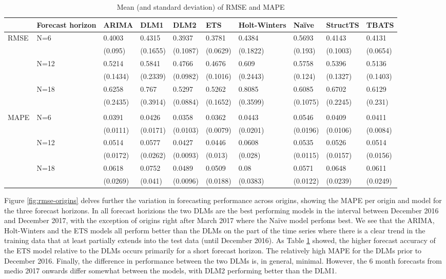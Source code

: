 \documentclass[]{article}
\begin{document}
\begin{table}[t]

\caption{\label{tab:error-comparison}Mean (and standard deviation) of RMSE and MAPE}
\centering
\begin{tabular}{llllllllll}
\toprule
 & Forecast horizon & ARIMA & DLM1 & DLM2 & ETS & Holt-Winters & Naïve & StructTS & TBATS\\
\midrule
RMSE & N=6 & 0.4003 & 0.4315 & 0.3937 & 0.3781 & 0.4384 & 0.5693 & 0.4143 & 0.4131\\
 &  & (0.095) & (0.1655) & (0.1087) & (0.0629) & (0.1822) & (0.193) & (0.1003) & (0.0654)\\
 & N=12 & 0.5214 & 0.5841 & 0.4766 & 0.4676 & 0.609 & 0.5758 & 0.5396 & 0.5136\\
 &  & (0.1434) & (0.2339) & (0.0982) & (0.1016) & (0.2443) & (0.124) & (0.1327) & (0.1403)\\
 & N=18 & 0.6258 & 0.767 & 0.5297 & 0.5262 & 0.8085 & 0.6085 & 0.6702 & 0.6129\\
\addlinespace
 &  & (0.2435) & (0.3914) & (0.0884) & (0.1652) & (0.3599) & (0.1075) & (0.2245) & (0.231)\\
 &  &  &  &  &  &  &  &  & \\
MAPE & N=6 & 0.0391 & 0.0426 & 0.0358 & 0.0362 & 0.0443 & 0.0546 & 0.0409 & 0.0411\\
 &  & (0.0111) & (0.0171) & (0.0103) & (0.0079) & (0.0201) & (0.0196) & (0.0106) & (0.0084)\\
 & N=12 & 0.0514 & 0.0577 & 0.0427 & 0.0446 & 0.0608 & 0.0535 & 0.0526 & 0.0514\\
\addlinespace
 &  & (0.0172) & (0.0262) & (0.0093) & (0.013) & (0.028) & (0.0115) & (0.0157) & (0.0156)\\
 & N=18 & 0.0618 & 0.0752 & 0.0489 & 0.0509 & 0.08 & 0.0571 & 0.0648 & 0.0611\\
 &  & (0.0269) & (0.041) & (0.0096) & (0.0188) & (0.0383) & (0.0122) & (0.0239) & (0.0249)\\
\bottomrule
\end{tabular}
\end{table}

Figure \ref{fig:rmse-origins} delves further the variation in
forecasting performance across origins, showing the MAPE per origin and
model for the three forecast horizons. In all forecast horizions the two
DLMs are the best performing models in the interval between December
2016 and December 2017, with the exception of origins right after March
2017 where the Naïve model perfoms best. We see that the ARIMA,
Holt-Winters and the ETS models all perform better than the DLMs on the
part of the time series where there is a clear trend in the training
data that at least partially extends into the test data (until December
2016). As Table \ref{tab:error-comparison} showed, the higher forecast
accuracy of the ETS model relative to the DLMs occurs primarily for a
short forecast horizon. The relatively high MAPE for the DLMs prior to
December 2016. Finally, the difference in performance between the two
DLMs is, in general, minimal. However, the 6 month forecasts from medio
2017 onwards differ somewhat between the models, with DLM2 performing
better than the DLM1.
\end{document}
